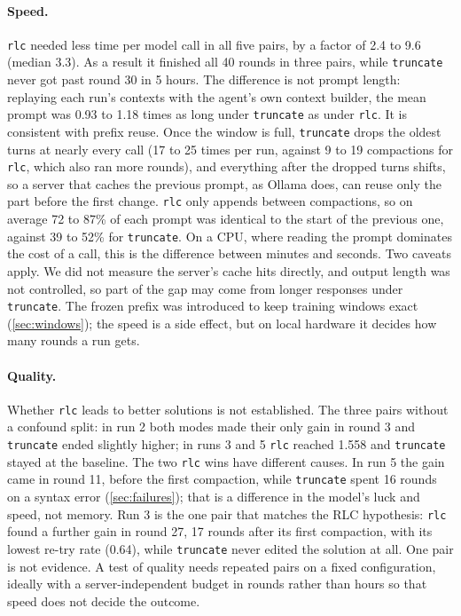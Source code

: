 \documentclass[11pt]{article}
\newcommand{\code}[1]{\texttt{#1}}
\begin{document}
\paragraph{Speed.} \code{rlc} needed less time per model call in all five pairs, by a factor of 2.4 to 9.6 (median 3.3). As a result it finished all 40 rounds in three pairs, while \code{truncate} never got past round 30 in 5 hours. The difference is not prompt length: replaying each run's contexts with the agent's own context builder, the mean prompt was 0.93 to 1.18 times as long under \code{truncate} as under \code{rlc}. It is consistent with prefix reuse. Once the window is full, \code{truncate} drops the oldest turns at nearly every call (17 to 25 times per run, against 9 to 19 compactions for \code{rlc}, which also ran more rounds), and everything after the dropped turns shifts, so a server that caches the previous prompt, as Ollama does, can reuse only the part before the first change. \code{rlc} only appends between compactions, so on average 72 to 87\% of each prompt was identical to the start of the previous one, against 39 to 52\% for \code{truncate}. On a CPU, where reading the prompt dominates the cost of a call, this is the difference between minutes and seconds. Two caveats apply. We did not measure the server's cache hits directly, and output length was not controlled, so part of the gap may come from longer responses under \code{truncate}. The frozen prefix was introduced to keep training windows exact (\cref{sec:windows}); the speed is a side effect, but on local hardware it decides how many rounds a run gets.

\paragraph{Quality.} Whether \code{rlc} leads to better solutions is not established. The three pairs without a confound split: in run 2 both modes made their only gain in round 3 and \code{truncate} ended slightly higher; in runs 3 and 5 \code{rlc} reached 1.558 and \code{truncate} stayed at the baseline. The two \code{rlc} wins have different causes. In run 5 the gain came in round 11, before the first compaction, while \code{truncate} spent 16 rounds on a syntax error (\cref{sec:failures}); that is a difference in the model's luck and speed, not memory. Run 3 is the one pair that matches the RLC hypothesis: \code{rlc} found a further gain in round 27, 17 rounds after its first compaction, with its lowest re-try rate (0.64), while \code{truncate} never edited the solution at all. One pair is not evidence. A test of quality needs repeated pairs on a fixed configuration, ideally with a server-independent budget in rounds rather than hours so that speed does not decide the outcome.
\end{document}
